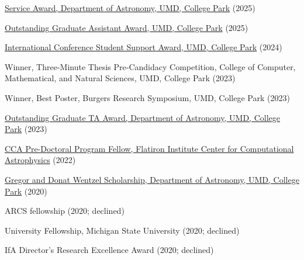 \item[{\color{numcolor}\scriptsize17}] \href{https://www.astro.umd.edu/resources/internal/awards/dept/service.html}{Service Award, Department of Astronomy, UMD, College Park} (2025)


\item[{\color{numcolor}\scriptsize16}] \href{https://gradschool.umd.edu/sites/default/files/2025-05/OGA_AY24-25.pdf}{Outstanding Graduate Assistant Award, UMD, College Park} (2025)

\item[{\color{numcolor}\scriptsize15}] \href{https://gradschool.umd.edu/funding/student-fellowships-awards/graduate-school-travel-grants}{International Conference Student Support Award, UMD, College Park} (2024)

\item[{\color{numcolor}\scriptsize14}] Winner, Three-Minute Thesis Pre-Candidacy Competition, College of Computer, Mathematical, and Natural Sciences, UMD, College Park (2023)

\item[{\color{numcolor}\scriptsize13}] Winner, Best Poster, Burgers Research Symposium, UMD, College Park (2023)

\item[{\color{numcolor}\scriptsize12}] \href{https://www.astro.umd.edu/resources/internal/awards/dept/angerhofer.html}{Outstanding Graduate TA Award, Department of Astronomy, UMD, College Park} (2023)

\item[{\color{numcolor}\scriptsize11}] \href{https://www.simonsfoundation.org/flatiron-institute-center-for-computational-astrophysics-pre-doctoral-program/}{CCA Pre-Doctoral Program Fellow, Flatiron Institute Center for Computational Astrophysics} (2022)

\item[{\color{numcolor}\scriptsize10}] \href{https://www.astro.umd.edu/resources/internal/awards/dept/wentzel.html}{Gregor and Donat Wentzel Scholarship, Department of Astronomy, UMD, College Park} (2020)

\item[{\color{numcolor}\scriptsize9}] ARCS fellowship (2020; declined)

\item[{\color{numcolor}\scriptsize8}] University Fellowship, Michigan State University (2020; declined)

\item[{\color{numcolor}\scriptsize7}] IfA Director's Research Excellence Award (2020; declined)

